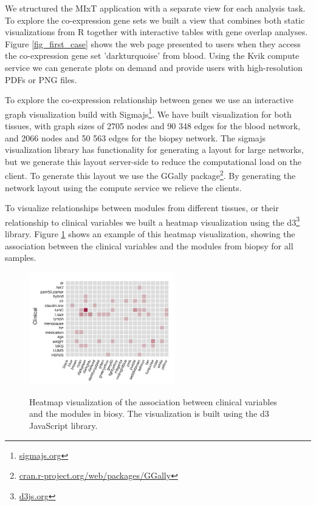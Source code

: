 We structured the MIxT application with a separate view for each analysis task.
To explore the co-expression gene sets we built a view that combines both static
visualizations from R together with interactive tables with gene overlap
analyses. Figure \ref{fig_first_case} shows the web page presented to users when
they access the co-expression gene set 'darkturquoise' from blood. Using the
Kvik compute service we can generate plots on demand and provide users with
high-resolution PDFs or PNG files. 

To explore the co-expression relationship between genes we use an interactive
graph visualization build with Sigmajs\footnote{\url{sigmajs.org}}. We have
built visualization for both tissues, with graph sizes of 2705 nodes and 90 348
edges for the blood network, and 2066 nodes and 50 563 edges for the biopsy
network. The sigmajs visualization library has functionality for generating a
layout for large networks, but we generate this layout server-side to reduce the
computational load on the client. To generate this layout we use the GGally
package\footnote{\url{cran.r-project.org/web/packages/GGally}}. By generating
the network layout using the compute service we relieve the clients.

To visualize relationships between modules from different tissues, or their
relationship to clinical variables we built a heatmap visualization using the 
d3\footnote{\url{d3js.org}} library. Figure \ref{fig_second_case} shows an
example of this heatmap visualization, showing the association between the
clinical variables and the modules from biopsy for all samples.  

\begin{figure}[h!]
\centering
\caption{Heatmap visualization of the association between clinical variables and
the modules in biosy. The visualization is built using the d3 JavaScript
library.} 
\includegraphics[width=2.5in]{figures/clinical-comp.png}
\label{fig_second_case}
\end{figure} 

